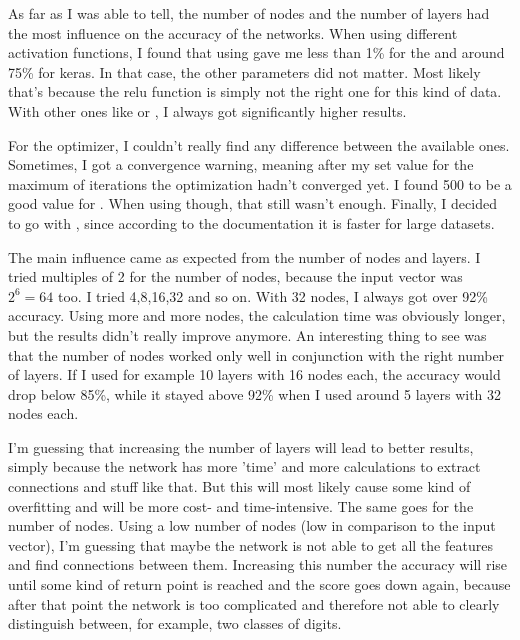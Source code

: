 	\clearpage
	
	\task[]
	
	As far as I was able to tell, the number of nodes and the number of layers had the most influence on the accuracy of the networks. When using different activation functions, I found that using  gave me less than 1\% for the  and around 75\% for keras. In that case, the other parameters did not matter. Most likely that's because the relu function is simply not the right one for this kind of data. With other ones like  or , I always got significantly higher results.
	
	For the optimizer, I couldn't really find any difference between the available ones. Sometimes, I got a convergence warning, meaning after my set value for the maximum of iterations the optimization hadn't converged yet. I found 500 to be a good value for . When using  though, that still wasn't enough. Finally, I decided to go with , since according to the documentation it is faster for large datasets. 
	
	The main influence came as expected from the number of nodes and layers. I tried multiples of 2 for the number of nodes, because the input vector was $2^6 = 64$ too. I tried 4,8,16,32 and so on. With 32 nodes, I always got over 92\% accuracy. Using more and more nodes, the calculation time was obviously longer, but the results didn't really improve anymore. An interesting thing to see was that the number of nodes worked only well in conjunction with the right number of layers. If I used for example 10 layers with 16 nodes each, the accuracy would drop below 85\%, while it stayed above 92\% when I used around 5 layers with 32 nodes each.
	
	I'm guessing that increasing the number of layers will lead to better results, simply because the network has more 'time' and more calculations to extract connections and stuff like that. But this will most likely cause some kind of overfitting and will be more cost- and time-intensive. The same goes for the number of nodes. Using a low number of nodes (low in comparison to the input vector), I'm guessing that maybe the network is not able to get all the features and find connections between them. Increasing this number the accuracy will rise until some kind of return point is reached and the score goes down again, because after that point the network is too complicated and therefore not able to clearly distinguish between, for example, two classes of digits. 


      
